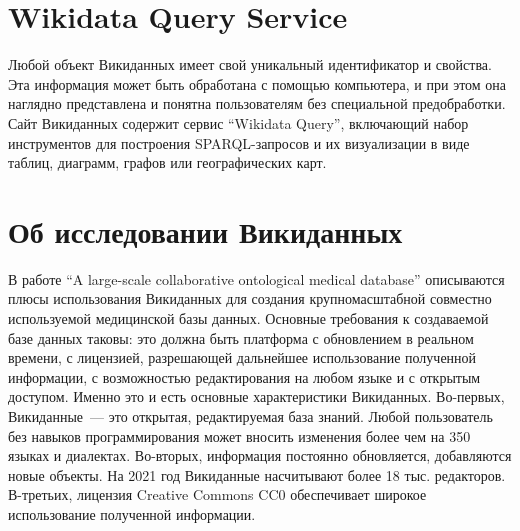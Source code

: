 \section{Wikidata Query Service}
\label{sect:WDQS}

Любой объект Викиданных имеет свой уникальный идентификатор и свойства. Эта информация может быть обработана с помощью компьютера, и при этом она наглядно представлена и понятна пользователям без специальной предобработки. Сайт Викиданных содержит сервис ``Wikidata Query''\footnotemark {}, включающий набор инструментов для построения SPARQL-запросов и их визуализации в виде таблиц, диаграмм, графов или географических карт.

\section{Об исследовании Викиданных}

В работе ``A large-scale collaborative ontological medical database''\autocite{Collaborative_ontological_database} 
описываются плюсы использования Викиданных для создания крупномасштабной 
совместно используемой медицинской базы данных. 
Основные требования к создаваемой базе данных таковы: 
это должна быть платформа с обновлением в реальном времени, 
с лицензией, разрешающей дальнейшее использование полученной информации, 
с возможностью редактирования на любом языке и с открытым доступом. 
Именно это и есть основные характеристики Викиданных. 
Во-первых, Викиданные~--- это открытая, редактируемая база знаний. 
Любой пользователь без навыков программирования может вносить изменения 
более чем на 350 языках и диалектах. 
Во-вторых, информация постоянно обновляется, добавляются новые объекты. 
На 2021 год Викиданные насчитывают более 18 тыс. редакторов\footnotemark. 
В-третьих, лицензия Creative Commons CC0 обеспечивает широкое использование полученной информации. 

